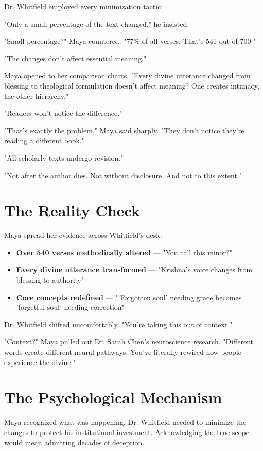\documentclass[11pt,twoside]{book}
\begin{document}
Dr. Whitfield employed every minimization tactic:

"Only a small percentage of the text changed," he insisted.

"Small percentage?" Maya countered. "77\% of all verses. That's 541 out of 700."

"The changes don't affect essential meaning."

Maya opened to her comparison charts. "Every divine utterance changed from blessing to theological formulation doesn't affect meaning? One creates intimacy, the other hierarchy."

"Readers won't notice the difference."

"That's exactly the problem," Maya said sharply. "They don't notice they're reading a different book."

"All scholarly texts undergo revision."

"Not after the author dies. Not without disclosure. And not to this extent."
\section*{The Reality Check}
\label{sec:org888d98c}

Maya spread her evidence across Whitfield's desk:

\begin{itemize}
\item \textbf{\textbf{Over 540 verses methodically altered}} — "You call this minor?"
\item \textbf{\textbf{Every divine utterance transformed}} — "Krishna's voice changes from blessing to authority"
\item \textbf{\textbf{Core concepts redefined}} — "'Forgotten soul' needing grace becomes 'forgetful soul' needing correction"
\end{itemize}

Dr. Whitfield shifted uncomfortably. "You're taking this out of context."

"Context?" Maya pulled out Dr. Sarah Chen's neuroscience research. "Different words create different neural pathways. You've literally rewired how people experience the divine."
\section*{The Psychological Mechanism}
\label{sec:orge74d397}

Maya recognized what was happening. Dr. Whitfield needed to minimize the changes to protect his institutional investment. Acknowledging the true scope would mean admitting decades of deception.
\end{document}

